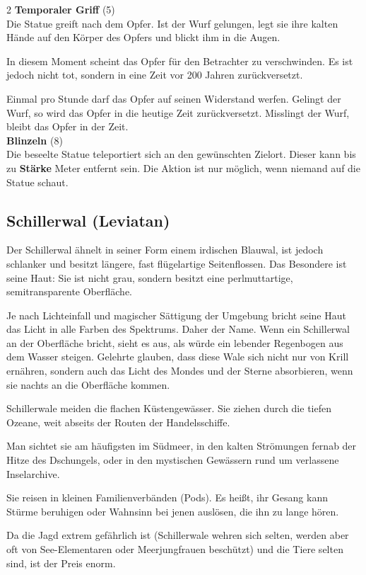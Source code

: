 \begin{multicols}{2}
    \textbf{Temporaler Griff} (5)\\
    Die Statue greift nach dem Opfer. Ist der Wurf gelungen, legt sie ihre kalten Hände auf den Körper des Opfers und blickt ihm in die Augen.

In diesem Moment scheint das Opfer für den Betrachter zu verschwinden. Es ist jedoch nicht tot, sondern in eine Zeit vor 200 Jahren zurückversetzt. 

Einmal pro Stunde darf das Opfer auf seinen Widerstand werfen. Gelingt der Wurf, so wird das Opfer in die heutige Zeit zurückversetzt. Misslingt der Wurf, bleibt das Opfer in der Zeit.\\
    \textbf{Blinzeln} (8)\\
    Die beseelte Statue teleportiert sich an den gewünschten Zielort. Dieser kann bis zu \textbf{Stärke} Meter entfernt sein. Die Aktion ist nur möglich, wenn niemand auf die Statue schaut.\\


    \subsection*{Schillerwal (Leviatan)}

    Der Schillerwal ähnelt in seiner Form einem irdischen Blauwal, ist jedoch schlanker und besitzt längere, fast flügelartige Seitenflossen. Das Besondere ist seine Haut: Sie ist nicht grau, sondern besitzt eine perlmuttartige, semitransparente Oberfläche.

Je nach Lichteinfall und magischer Sättigung der Umgebung bricht seine Haut das Licht in alle Farben des Spektrums. Daher der Name. Wenn ein Schillerwal an der Oberfläche bricht, sieht es aus, als würde ein lebender Regenbogen aus dem Wasser steigen.
Gelehrte glauben, dass diese Wale sich nicht nur von Krill ernähren, sondern auch das Licht des Mondes und der Sterne absorbieren, wenn sie nachts an die Oberfläche kommen.

Schillerwale meiden die flachen Küstengewässer. Sie ziehen durch die tiefen Ozeane, weit abseits der Routen der Handelsschiffe.

Man sichtet sie am häufigsten im Südmeer, in den kalten Strömungen fernab der Hitze des Dschungels, oder in den mystischen Gewässern rund um verlassene Inselarchive.

Sie reisen in kleinen Familienverbänden (Pods). Es heißt, ihr Gesang kann Stürme beruhigen oder Wahnsinn bei jenen auslösen, die ihn zu lange hören.

Da die Jagd extrem gefährlich ist (Schillerwale wehren sich selten, werden aber oft von See-Elementaren oder Meerjungfrauen beschützt) und die Tiere selten sind, ist der Preis enorm.


\end{multicols}
